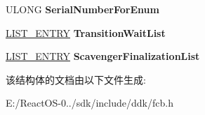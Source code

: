 \begin{DoxyCompactItemize}
U\+L\+O\+NG {\bfseries Serial\+Number\+For\+Enum}
\item 
\mbox{\label{struct___v___n_e_t___r_o_o_t_ac9ff52098d567401c16fe53be48d4bb3}} 
\hyperlink{struct___l_i_s_t___e_n_t_r_y}{L\+I\+S\+T\+\_\+\+E\+N\+T\+RY} {\bfseries Transition\+Wait\+List}
\item 
\mbox{\label{struct___v___n_e_t___r_o_o_t_a510669ab06a8137399a34f6e79a4172c}} 
\hyperlink{struct___l_i_s_t___e_n_t_r_y}{L\+I\+S\+T\+\_\+\+E\+N\+T\+RY} {\bfseries Scavenger\+Finalization\+List}
\end{DoxyCompactItemize}


该结构体的文档由以下文件生成\+:\begin{DoxyCompactItemize}
\item 
E\+:/\+React\+O\+S-\/0../sdk/include/ddk/fcb.\+h\end{DoxyCompactItemize}
